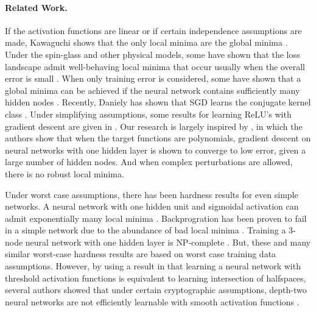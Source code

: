 
\paragraph{Related Work.}
If the activation functions are linear or
if certain independence assumptions are made, Kawaguchi shows that the
only local minima are the global minima \cite{Kawaguchi16a}. Under the
spin-glass and other physical models, some have shown that the loss
landscape admit well-behaving local minima that occur usually when the
overall error is small
\cite{ChoromanskaHMAL14, DauphinPGCGB14}. When only training
error is considered, some have shown that a global minima can be
achieved if the neural network contains sufficiently many hidden nodes
\cite{SoudryC16}. Recently, Daniely has shown that SGD learns the conjugate kernel class \cite{daniely2017sgd}. Under simplifying assumptions, some results for learning ReLU's with gradient descent are given in \cite{tian2017analytical, brutzkus2017globally}. Our research is largely inspired by
\cite{valiant2014learning}, in which the authors show that when the
target functions are polynomials, gradient descent on neural networks
with one hidden layer is shown to converge to low error, given a large
number of hidden nodes. And when complex perturbations are allowed,
there is no robust local minima.

Under worst case assumptions, there has been hardness results for even simple networks. A neural network with one hidden unit and sigmoidal activation can admit exponentially many local minima \cite{Auer}. Backprogration has been proven to fail in a simple network due to the abundance of bad local minima \cite{brady1989back}. Training a 3-node neural network with one hidden layer is { NP}-complete \cite{BlumR88}.  But, these and many similar worst-case hardness results are based on worst case training data assumptions. However, by using a result in \cite{klivans2006cryptographic} that learning a neural network with threshold activation functions is equivalent to learning intersection of halfspaces, several authors showed that under certain cryptographic assumptions, depth-two neural networks are not efficiently learnable with smooth activation functions \cite{LivniSS14, ZhangLWJ15, ZhangLJ15}.


